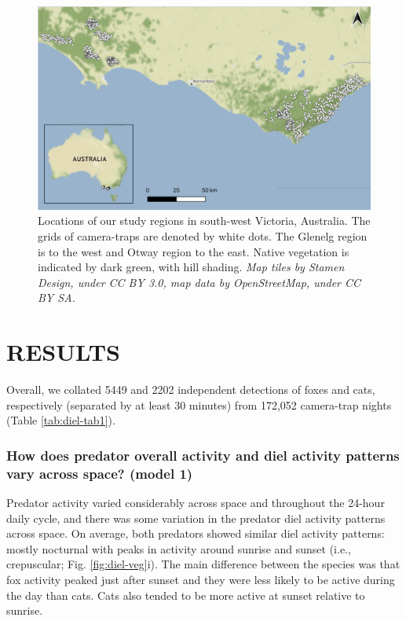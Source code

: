 \documentclass[]{elsarticle} %
\begin{document}
\begin{figure}

{\centering \includegraphics[width=1\linewidth]{../figs/map_cams} 

}

\caption{Locations of our study regions in south-west Victoria, Australia. The grids of camera-traps are denoted by white dots. The Glenelg region is to the west and Otway region to the east. Native vegetation is indicated by dark green, with hill shading. \textit{Map tiles by Stamen Design, under CC BY 3.0, map data by OpenStreetMap, under CC BY SA.}}\label{fig:diel-map}
\end{figure}

\newpage

\hypertarget{results}{%
\section{RESULTS}\label{results}}

Overall, we collated 5449 and 2202 independent detections of foxes and cats, respectively (separated by at least 30 minutes) from 172,052 camera-trap nights (Table \ref{tab:diel-tab1}).

\hypertarget{how-does-predator-overall-activity-and-diel-activity-patterns-vary-across-space-model-1-1}{%
\subsubsection{How does predator overall activity and diel activity patterns vary across space? (model 1)}\label{how-does-predator-overall-activity-and-diel-activity-patterns-vary-across-space-model-1-1}}

Predator activity varied considerably across space and throughout the 24-hour daily cycle, and there was some variation in the predator diel activity patterns across space. On average, both predators showed similar diel activity patterns: mostly nocturnal with peaks in activity around sunrise and sunset (i.e., crepuscular; Fig. \ref{fig:diel-veg}i). The main difference between the species was that fox activity peaked just after sunset and they were less likely to be active during the day than cats. Cats also tended to be more active at sunset relative to sunrise.
\end{document}
